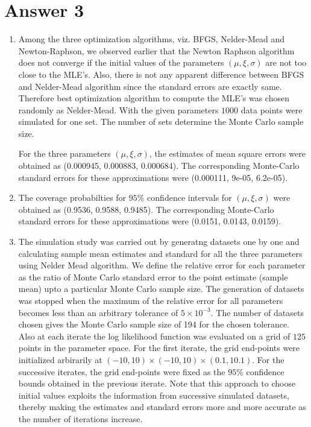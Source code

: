\documentclass[12pt]{article}
\begin{document}
\section*{Answer 3}
\begin{enumerate}[label=(\alph*)]
\item Among the three optimization algorithms, viz. BFGS, Nelder-Mead and Newton-Raphson, we observed earlier that the Newton Raphson algorithm does not converge if the initial values of the parameters $(\mu,\xi,\sigma)$ are not too close to the MLE's. Also, there is not any apparent difference between BFGS and Nelder-Mead algorithm since the standard errors are exactly same. Therefore best optimization algorithm to compute the MLE's was chosen randomly as Nelder-Mead. With the given parameters $1000$ data points were simulated for one set. The number of sets determine the Monte Carlo sample size.


For the three parameters $(\mu,\xi,\sigma)$, the estimates of mean square errors were obtained as (0.000945, 0.000883, 0.000684). The corresponding Monte-Carlo standard errors for these approximations were (0.000111, 9e-05, 6.2e-05).

\item The coverage probabilties for $95\%$ confidence intervals for $(\mu,\xi,\sigma)$ were obtained as (0.9536, 0.9588, 0.9485). The corresponding Monte-Carlo standard errors for these approximations were (0.0151, 0.0143, 0.0159).

\item The simulation study was carried out by generatng datasets one by one and calculating sample mean estimates and standard for all the three parameters using Nelder Mead algorithm. We define the relative error for each parameter as the ratio of Monte Carlo standard error to the point estimate (sample mean) upto a particular Monte Carlo sample size. The generation of datasets was stopped when the maximum of the relative error for all parameters becomes less than an arbitrary tolerance of $5 \times 10^{-3}$. The number of datasets chosen gives the Monte Carlo sample size of 194 for the chosen tolerance. Also at each iterate the log likelihood function was evaluated on a grid of $125$ points in the parameter space. For the first iterate, the grid end-points were initialized arbirarily at $(-10,10)\times (-10,10)\times (0.1,10.1)$. For the successive iterates, the grid end-points were fixed as the $95\%$ confidence bounds obtained in the previous iterate. Note that this approach to choose initial values exploits the information from successive simulated datasets, thereby making the estimates and standard errors more and more accurate as the number of iterations increase.
\end{enumerate}
\end{document}
